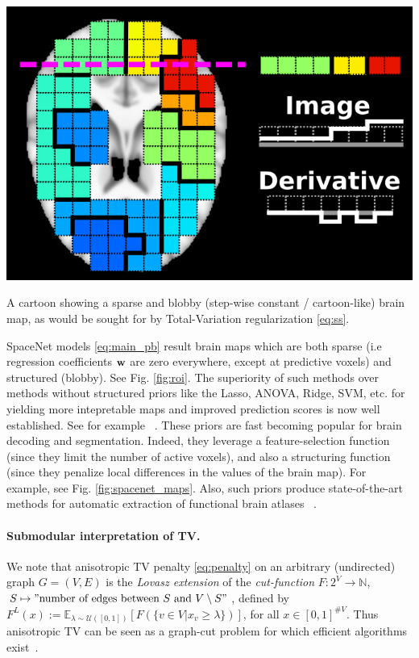 \begin{marginfigure}
  \includegraphics[width=1\linewidth]{figures/tv_cartoon_horizontal.png}
  \caption{A cartoon showing a sparse and blobby (step-wise constant / cartoon-like) brain map,
  as would be sought for by Total-Variation regularization \eqref{eq:ss}.}
  \label{fig:roi}
\end{marginfigure}

SpaceNet models \eqref{eq:main_pb} result brain maps which are both
sparse (i.e regression coefficients $\mathbf{w}$ are zero everywhere, except at
predictive voxels) and structured (blobby). See Fig. \ref{fig:roi}. The superiority of such
methods over methods without structured priors like the Lasso, ANOVA,
Ridge, SVM, etc. for yielding more intepretable maps and improved
prediction scores is now well established. See for example
 ~\citep{baldassarre2012,gramfort2013}. These priors are fast becoming
popular for brain decoding and segmentation. Indeed, they leverage a
feature-selection function
(since they limit the number of active voxels),
and also a structuring function
(since they penalize local
differences in the values of the brain map). For example, see Fig.
\ref{fig:spacenet_maps}.
Also, such priors produce state-of-the-art methods for automatic
extraction of functional brain atlases  ~\citep{abraham2013}.

\begin{shaded}
  \paragraph{Submodular interpretation of TV.} We note that anisotropic TV penalty \eqref{eq:penalty} on
  an arbitrary (undirected) graph $G = (V,E)$ is the \textit{Lovasz extension} of the \textit{cut-function}
  $F : 2^V \rightarrow \mathbb N$, $S \mapsto "\text{number of edges between } S \text{ and }V\setminus S"$,
defined by $F^L(x) := \mathbb E_{\lambda \sim \mathcal U([0,1])}[F(\{v \in V|x_v \ge \lambda\})]$, for all $x \in [0,1]^{\#V}$. Thus anisotropic TV can be seen as a graph-cut problem for which efficient algorithms exist~\citep{bach13sub,landrieu16}.
\end{shaded}

